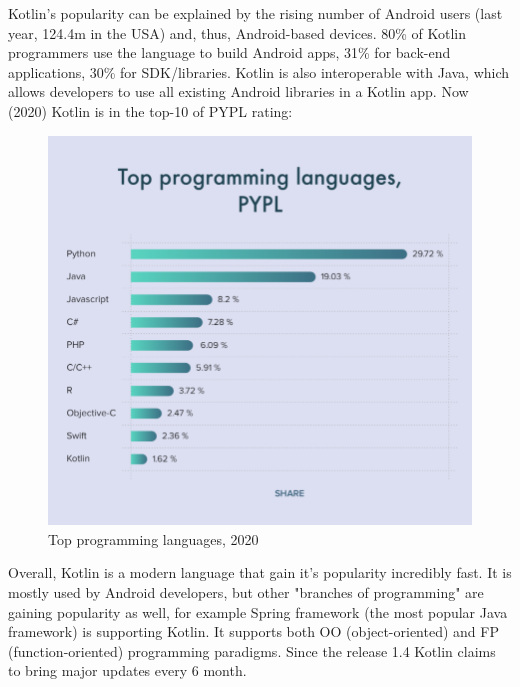 Kotlin's popularity can be explained by the rising number of Android users (last year, 124.4m in the USA) and, thus, Android-based devices. 80\% of Kotlin programmers use the language to build Android apps, 31\% for back-end applications, 30\% for SDK/libraries.
Kotlin is also interoperable with Java, which allows developers to use all existing Android libraries in a Kotlin app. Now (2020) Kotlin is in the top-10 of PYPL rating:

\begin{figure}[H]
    \centering
    \includegraphics[scale = 0.3]{pictures/kotlinRating.png}
    \caption{Top programming languages, 2020}
    \label{fig:top_languages}
\end{figure}

Overall, Kotlin is a modern language that gain it's popularity incredibly fast. It is mostly used by Android developers, but other "branches of programming" are gaining popularity as well, for example Spring framework (the most popular Java framework) is supporting Kotlin. It supports both OO (object-oriented) and FP (function-oriented) programming paradigms. Since the release 1.4 Kotlin claims to bring major updates every 6 month.